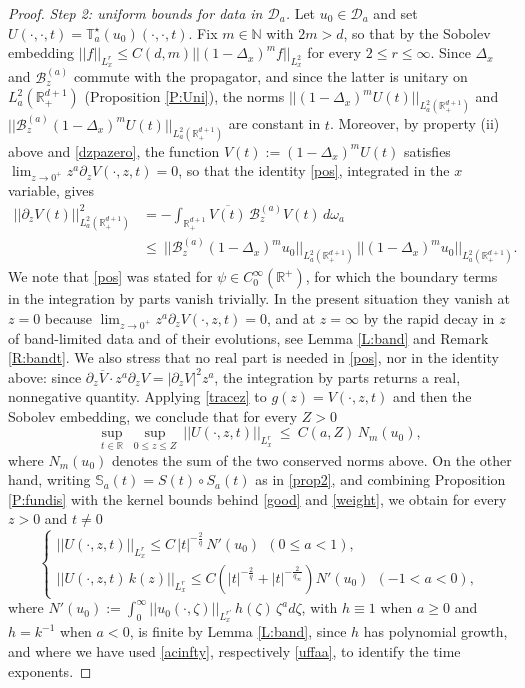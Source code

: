 \documentclass[11pt,letter]{amsart}
\def \RN {\mathbb{R}_+^{d+1}}
\def \R {\mathbb{R}}
\newcommand{\Ba}{\mathscr B_z^{(a)}}
\newcommand{\p}{\partial}
\numberwithin{equation}{section}
\numberwithin{equation}{section}
\begin{document}
\begin{proof}
\smallskip
\noindent \emph{Step 2: uniform bounds for data in $\mathcal D_a$.} Let $u_0\in \mathcal D_a$ and set $U(\cdot,\cdot,t) = \mathbb T^\star_a(u_0)(\cdot,\cdot,t)$. Fix $m\in \mathbb N$ with $2m>d$, so that by the Sobolev embedding $||f||_{L^r_x}\le C(d,m)||(1-\Delta_x)^mf||_{L^2_x}$ for every $2\le r\le \infty$. Since $\Delta_x$ and $\Ba$ commute with the propagator, and since the latter is unitary on $L^2_a(\RN)$ (Proposition \ref{P:Uni}), the norms $||(1-\Delta_x)^mU(t)||_{L^2_a(\RN)}$ and $||\Ba(1-\Delta_x)^mU(t)||_{L^2_a(\RN)}$ are constant in $t$. Moreover, by property (ii) above and \eqref{dzpazero}, the function $V(t):=(1-\Delta_x)^mU(t)$ satisfies $\lim_{z\to0^+}z^a\p_zV(\cdot,z,t)=0$, so that the identity \eqref{pos}, integrated in the $x$ variable, gives
\begin{align*}
||\p_zV(t)||^2_{L^2_a(\RN)} & = -\int_{\RN}\overline{V(t)}\,\Ba V(t)\, d\omega_a
\\
& \le\ ||\Ba(1-\Delta_x)^mu_0||_{L^2_a(\RN)}\, ||(1-\Delta_x)^mu_0||_{L^2_a(\RN)}.
\end{align*}
We note that \eqref{pos} was stated for $\psi\in C^\infty_0(\R^+)$, for which the boundary terms in the integration by parts vanish trivially. In the present situation they vanish at $z=0$ because $\lim_{z\to0^+}z^a\p_zV(\cdot,z,t)=0$, and at $z=\infty$ by the rapid decay in $z$ of band-limited data and of their evolutions, see Lemma \ref{L:band} and Remark \ref{R:bandt}. We also stress that no real part is needed in \eqref{pos}, nor in the identity above: since $\p_z\overline V\cdot z^a\p_zV = |\p_zV|^2 z^a$, the integration by parts returns a real, nonnegative quantity.
Applying \eqref{tracez} to $g(z) = V(\cdot,z,t)$ and then the Sobolev embedding, we conclude that for every $Z>0$
\begin{equation}\label{unibulk}
\sup_{t\in \R}\ \sup_{0\le z\le Z}\ ||U(\cdot,z,t)||_{L^r_x}\ \le\ C(a,Z)\, N_m(u_0),
\end{equation}
where $N_m(u_0)$ denotes the sum of the two conserved norms above. On the other hand, writing $\mathbb S_a(t) = S(t)\circ S_a(t)$ as in \eqref{prop2}, and combining Proposition \ref{P:fundis} with the kernel bounds behind \eqref{good} and \eqref{weight}, we obtain for every $z>0$ and $t\neq0$
\begin{equation}\label{decaybulk}
\begin{cases}
||U(\cdot,z,t)||_{L^r_x}\le 
C\,|t|^{-\frac 2q}\, N'(u_0)\ \ (0\le a<1),
\\
||U(\cdot,z,t)\,k(z)||_{L^r_x}\le C\left(|t|^{-\frac 2q}+|t|^{-\frac{2}{q_\infty}}\right)N'(u_0)\ \ (-1<a<0),
\end{cases}
\end{equation}
where $N'(u_0):=\int_0^\infty ||u_0(\cdot,\zeta)||_{L^{r'}_x}\, h(\zeta)\,\zeta^ad\zeta$, with $h\equiv1$ when $a\ge0$ and $h = k^{-1}$ when $a<0$, is finite by Lemma \ref{L:band}, since $h$ has polynomial growth, and where we have used \eqref{acinfty}, respectively \eqref{uffaa}, to identify the time exponents.


\end{proof}
\end{document}

